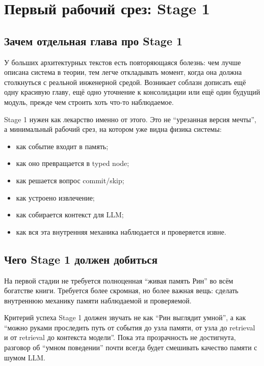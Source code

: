 \chapter{Первый рабочий срез: Stage 1}
\label{ch:stage1}

\section{Зачем отдельная глава про Stage 1}

У больших архитектурных текстов есть повторяющаяся болезнь: чем лучше
описана система в теории, тем легче откладывать момент, когда она должна
столкнуться с реальной инженерной средой. Возникает соблазн дописать ещё
одну красивую главу, ещё одно уточнение к консолидации или ещё один будущий
модуль, прежде чем строить хоть что-то наблюдаемое.

Stage 1 нужен как лекарство именно от этого. Это не ``урезанная версия
мечты'', а минимальный рабочий срез, на котором уже видна физика системы:

\begin{itemize}\itemsep2pt
\item как событие входит в память;
\item как оно превращается в typed node;
\item как решается вопрос commit/skip;
\item как устроено извлечение;
\item как собирается контекст для LLM;
\item как вся эта внутренняя механика наблюдается и проверяется извне.
\end{itemize}

\section{Чего Stage 1 должен добиться}

На первой стадии не требуется полноценная ``живая память Рин'' во всём
богатстве книги. Требуется более скромная, но более важная вещь: сделать
внутреннюю механику памяти наблюдаемой и проверяемой.

\begin{principle}
Критерий успеха Stage 1 должен звучать не как ``Рин выглядит умной'', а как
``можно руками проследить путь от события до узла памяти, от узла до retrieval
и от retrieval до контекста модели''. Пока эта прозрачность не достигнута,
разговор об ``умном поведении'' почти всегда будет смешивать качество памяти с
шумом LLM.
\end{principle}

